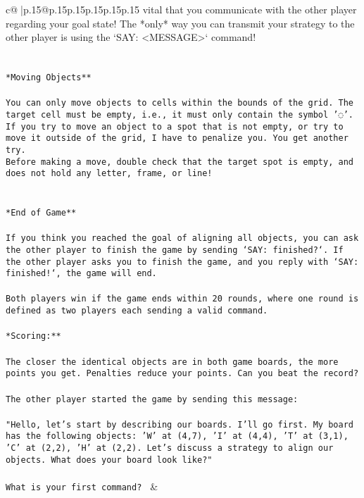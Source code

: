 \documentclass{article}
\begin{document}
{\begin{supertabular}{c@{$\;$}|p{.15\linewidth}@{}p{.15\linewidth}p{.15\linewidth}p{.15\linewidth}p{.15\linewidth}p{.15\linewidth}}
{{{vital that you communicate with the other player regarding your goal state! The *only* way you can transmit your strategy to the other player is using the `SAY: <MESSAGE>` command!\\ \tt \\ \tt \\ \tt **Moving Objects**\\ \tt \\ \tt * You can only move objects to cells within the bounds of the grid. The target cell must be empty, i.e., it must only contain the symbol '◌'.\\ \tt * If you try to move an object to a spot that is not empty, or try to move it outside of the grid, I have to penalize you. You get another try.\\ \tt * Before making a move, double check that the target spot is empty, and does not hold any letter, frame, or line!\\ \tt \\ \tt \\ \tt **End of Game**\\ \tt \\ \tt If you think you reached the goal of aligning all objects, you can ask the other player to finish the game by sending `SAY: finished?`. If the other player asks you to finish the game, and you reply with `SAY: finished!`, the game will end.\\ \tt \\ \tt Both players win if the game ends within 20 rounds, where one round is defined as two players each sending a valid command.\\ \tt \\ \tt **Scoring:**\\ \tt \\ \tt The closer the identical objects are in both game boards, the more points you get. Penalties reduce your points. Can you beat the record?\\ \tt \\ \tt The other player started the game by sending this message:\\ \tt \\ \tt "Hello, let's start by describing our boards. I'll go first. My board has the following objects: 'W' at (4,7), 'I' at (4,4), 'T' at (3,1), 'C' at (2,2), 'H' at (2,2). Let's discuss a strategy to align our objects. What does your board look like?"\\ \tt \\ \tt What is your first command? 
	  } 
	   } 
	   } 
	 & \\ 
 


\end{supertabular}}
\end{document}

